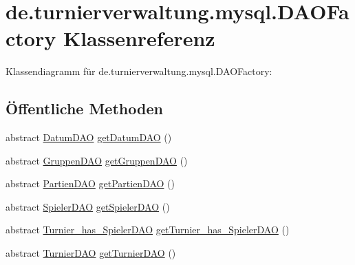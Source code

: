\hypertarget{classde_1_1turnierverwaltung_1_1mysql_1_1_d_a_o_factory}{}\section{de.\+turnierverwaltung.\+mysql.\+D\+A\+O\+Factory Klassenreferenz}
\label{classde_1_1turnierverwaltung_1_1mysql_1_1_d_a_o_factory}


Klassendiagramm für de.\+turnierverwaltung.\+mysql.\+D\+A\+O\+Factory\+:
\subsection*{Öffentliche Methoden}
\begin{DoxyCompactItemize}
\item 
abstract \hyperlink{interfacede_1_1turnierverwaltung_1_1mysql_1_1_datum_d_a_o}{Datum\+D\+AO} \hyperlink{classde_1_1turnierverwaltung_1_1mysql_1_1_d_a_o_factory_a12cdec2ca67ebce2fa0e51549491d5ee}{get\+Datum\+D\+AO} ()
\item 
abstract \hyperlink{interfacede_1_1turnierverwaltung_1_1mysql_1_1_gruppen_d_a_o}{Gruppen\+D\+AO} \hyperlink{classde_1_1turnierverwaltung_1_1mysql_1_1_d_a_o_factory_a0f3205a56e0d39a474a1a6b81966e036}{get\+Gruppen\+D\+AO} ()
\item 
abstract \hyperlink{interfacede_1_1turnierverwaltung_1_1mysql_1_1_partien_d_a_o}{Partien\+D\+AO} \hyperlink{classde_1_1turnierverwaltung_1_1mysql_1_1_d_a_o_factory_a9467da354c527ef88109fb2b0848759c}{get\+Partien\+D\+AO} ()
\item 
abstract \hyperlink{interfacede_1_1turnierverwaltung_1_1mysql_1_1_spieler_d_a_o}{Spieler\+D\+AO} \hyperlink{classde_1_1turnierverwaltung_1_1mysql_1_1_d_a_o_factory_ac155a6bf8bf1f3c9eb4818f8aaeee3c8}{get\+Spieler\+D\+AO} ()
\item 
abstract \hyperlink{interfacede_1_1turnierverwaltung_1_1mysql_1_1_turnier__has___spieler_d_a_o}{Turnier\+\_\+has\+\_\+\+Spieler\+D\+AO} \hyperlink{classde_1_1turnierverwaltung_1_1mysql_1_1_d_a_o_factory_a094d9e9388d9903c49effab01a5fb10a}{get\+Turnier\+\_\+has\+\_\+\+Spieler\+D\+AO} ()
\item 
abstract \hyperlink{interfacede_1_1turnierverwaltung_1_1mysql_1_1_turnier_d_a_o}{Turnier\+D\+AO} \hyperlink{classde_1_1turnierverwaltung_1_1mysql_1_1_d_a_o_factory_a6f118b98d89be3e454bc7f6a984b6c51}{get\+Turnier\+D\+AO} ()
\end{DoxyCompactItemize}
